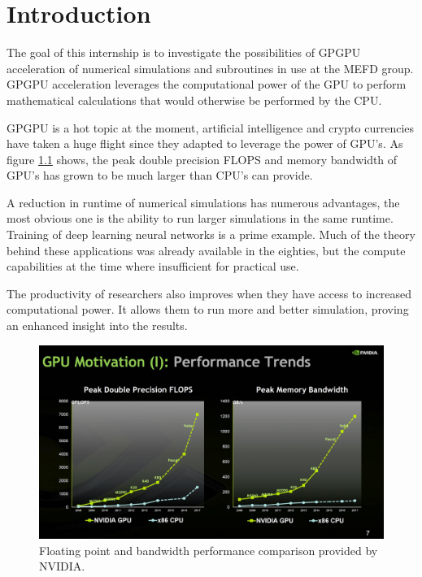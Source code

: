 \chapter{Introduction}

\hspace{5mm}The goal of this internship is to investigate the possibilities of GPGPU acceleration of numerical simulations and subroutines in use at the MEFD group. GPGPU acceleration leverages the computational power of the GPU to perform mathematical calculations that would otherwise be performed by the CPU.\vspace{4mm}

GPGPU is a hot topic at the moment, artificial intelligence and crypto currencies have taken a huge flight since they adapted to leverage the power of GPU's. As figure \ref{GPU chart 1} shows, the peak double precision FLOPS and memory bandwidth of GPU's has grown to be much larger than CPU's can provide.\vspace{4mm}

A reduction in runtime of numerical simulations has numerous advantages, the most obvious one is the ability to run larger simulations in the same runtime. Training of deep learning neural networks is a prime example. Much of the theory behind these applications was already available in the eighties, but the compute capabilities at the time where insufficient for practical use.\vspace{4mm}

The productivity of researchers also improves when they have access to increased computational power. It allows them to run more and better simulation, proving an enhanced insight into the results.

\begin{figure}[b!]
    \includegraphics[width=0.85\linewidth]{figures/NVIDIA-Pascal-and-Volta-Compute-Performance.jpg}
    \centering
    \caption{Floating point and bandwidth performance comparison provided by NVIDIA.}
    \label{GPU chart 1}
\end{figure}

